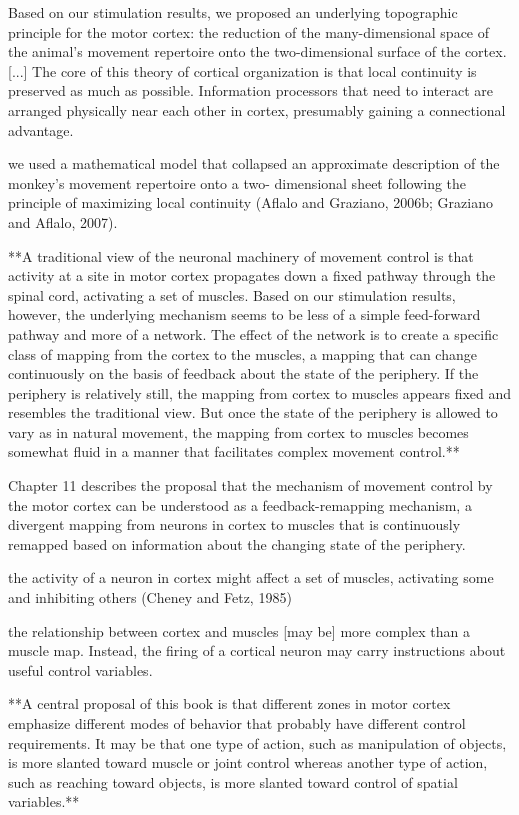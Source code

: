 \documentclass[../main.tex]{subfiles}
\begin{document}
{{Based on our stimulation results, we proposed an underlying topographic principle for the motor cortex: the reduction of the many-dimensional space of the animal’s movement repertoire onto the two-dimensional surface of the cortex. [...] The core of this theory of cortical organization is that local continuity is preserved as much as possible. Information processors that need to interact are arranged physically near each other in cortex, presumably gaining a connectional advantage.

we used a mathematical model that collapsed an approximate description of the monkey’s movement repertoire onto a two- dimensional sheet following the principle of maximizing local continuity (Aflalo and Graziano, 2006b; Graziano and Aflalo, 2007).

**A traditional view of the neuronal machinery of movement control is that activity at a site in motor cortex propagates down a fixed pathway through the spinal cord, activating a set of muscles. Based on our stimulation results, however, the underlying mechanism seems to be less of a simple feed-forward pathway and more of a network. The effect of the network is to create a specific class of mapping from the cortex to the muscles, a mapping that can change continuously on the basis of feedback about the state of the periphery. If the periphery is relatively still, the mapping from cortex to muscles appears fixed and resembles the traditional view. But once the state of the periphery is allowed to vary as in natural movement, the mapping from cortex to muscles becomes somewhat fluid in a manner that facilitates complex movement control.**

Chapter 11 describes the proposal that the mechanism of movement control by the motor cortex can be understood as a feedback-remapping mechanism, a divergent mapping from neurons in cortex to muscles that is continuously remapped based on information about the changing state of the periphery.

the activity of a neuron in cortex might affect a set of muscles, activating some and inhibiting others (Cheney and Fetz, 1985)

the relationship between cortex and muscles [may be] more complex than a muscle map. Instead, the firing of a cortical neuron may carry instructions about useful control variables.

**A central proposal of this book is that different zones in motor cortex emphasize different modes of behavior that probably have different control requirements. It may be that one type of action, such as manipulation of objects, is more slanted toward muscle or joint control whereas another type of action, such as reaching toward objects, is more slanted toward control of spatial variables.**

}}
\end{document}
